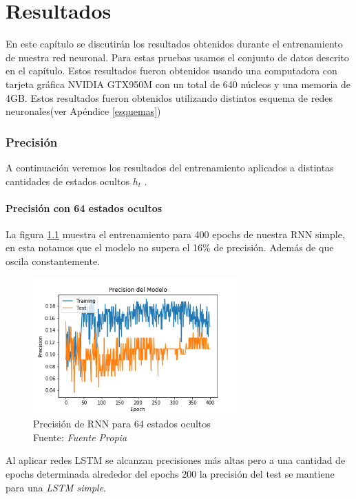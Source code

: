 \chapter{Resultados}
En este capítulo se discutirán los resultados obtenidos durante el entrenamiento de nuestra red neuronal.
Para estas pruebas usamos el conjunto de datos descrito en el capítulo. Estos resultados fueron
obtenidos usando una computadora con tarjeta gráfica NVIDIA GTX950M con
un total de 640 núcleos y una memoria de 4GB.
Estos resultados fueron obtenidos utilizando distintos esquema de redes neuronales(ver Apéndice \ref{esquemas})
\subsection{Precisión}
A continuación veremos los resultados del entrenamiento aplicados a distintas cantidades de estados ocultos $h_{t}$ .
\subsubsection{Precisión con 64 estados ocultos}

La figura \ref{RNNSIMPLE64} muestra el entrenamiento para 400 epochs de nuestra RNN simple, en esta notamos que el modelo no supera el 16\% de  precisión. Además de que oscila constantemente.

\begin{figure}[H]
	\centering
	\includegraphics[width=0.7\textwidth]{Figures/rnn_64_prec}
	\caption{Precisión de RNN para 64 estados ocultos\\ Fuente: {\textit{Fuente Propia}}}
	\label{RNNSIMPLE64}
\end{figure} 
Al aplicar redes LSTM se alcanzan precisiones más altas pero a una cantidad de epochs determinada alrededor del epochs 200 la precisión del test se mantiene para una \textit{LSTM simple}.

